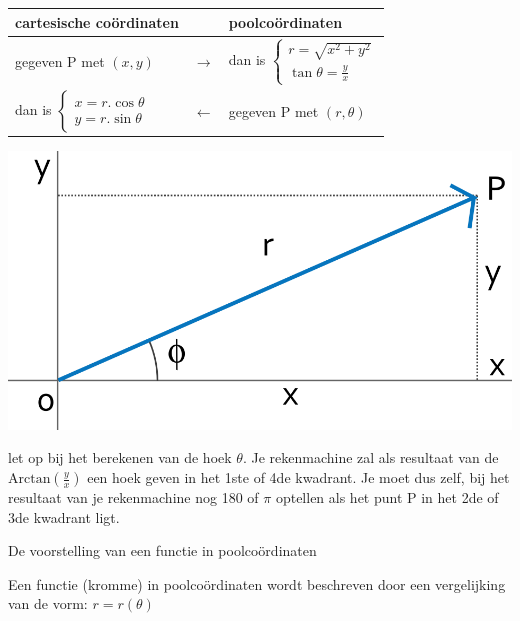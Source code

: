 \begin{minipage}{.48\linewidth}
	\begin{tabular}{lcl}
		cartesische co\"ordinaten &  & poolco\"ordinaten  \\
		\hline
		gegeven P met $\left(x,y\right)$ & $\rightarrow$ & dan is $\begin{cases}
		r=\sqrt{x^{2}+y^{2}}\\
		\tan\theta=\frac{y}{x}
		\end{cases}$  \\
		dan is $\begin{cases}
		x=r.\cos\theta\\
		y=r.\sin\theta
		\end{cases}$ & $\leftarrow$ & gegeven P met $\left(r,\theta\right)$ \\
	\end{tabular}
\end{minipage}
\hspace{1cm}
\begin{minipage}{.48\linewidth}
	\centering
	\includegraphics[width=0.7\linewidth]{2_elem_rekenvaardigheden_B/inputs/figuur9}
\end{minipage}

\vspace{1cm}

\begin{opmerking}
let op bij het berekenen van de hoek $\theta$. Je rekenmachine
zal als resultaat van de $\textrm{Arctan}\left(\frac{y}{x}\right)$
een hoek geven in het 1ste of 4de kwadrant. Je moet dus zelf, bij
het resultaat van je rekenmachine nog 180\textdegree{} of $\pi$ optellen
als het punt P in het 2de of 3de kwadrant ligt.
\end{opmerking}

De voorstelling van een functie in poolco\"ordinaten

Een functie (kromme) in poolco\"ordinaten wordt beschreven
door een vergelijking van de vorm: $r=r(\theta)$



